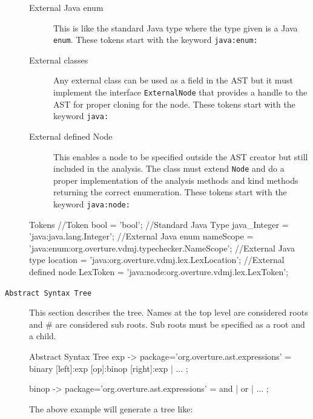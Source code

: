 \begin{description}
\begin{description}
\item [External Java enum] This is like the standard Java type where the type given is a Java \texttt{enum}.  These tokens start with the keyword \texttt{java:enum:}

\item [External classes] Any external class can be used as a field in the AST but it must implement the interface \texttt{ExternalNode} that provides a handle to the AST for proper cloning for the node.  These tokens start with the keyword \texttt{java:}

\item [External defined Node] This enables a node to be specified outside the AST creator but still included in the analysis. The class must extend \texttt{Node} and do a proper implementation of the analysis methods and kind methods returning the correct enumeration.  These tokens start with the keyword \texttt{java:node:}

\end{description}

\begin{astlst}
Tokens
//Token 
bool = 'bool'; 
//Standard Java Type
java_Integer = 'java:java.lang.Integer'; 
//External Java enum
nameScope = 'java:enum:org.overture.vdmj.typechecker.NameScope';
//External Java type
location = 'java:org.overture.vdmj.lex.LexLocation'; 
//External defined node
LexToken = 'java:node:org.overture.vdmj.lex.LexToken'; 
\end{astlst}

\item[\texttt{Abstract Syntax Tree}] This section describes the tree. Names at the top level are considered roots and \# are considered sub roots. Sub roots must be  specified as a root and a child. 

\begin{astlst}
Abstract Syntax Tree
exp {-> package='org.overture.ast.expressions'}
    =   {binary} [left]:exp [op]:binop [right]:exp
    |   ...
    ;

binop {-> package='org.overture.ast.expressions'}
    = {and}
    |   {or}
    |   ...
    ;
\end{astlst}



The above example will generate a tree like:
\begin{figure}[htb]
\begin{minipage}{0.5\linewidth}


\end{minipage}
\end{figure}
\end{description}
